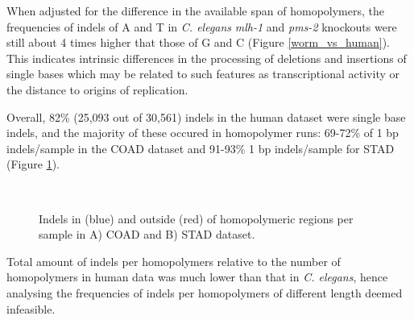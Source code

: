 When adjusted for the difference in the available span of homopolymers, the frequencies of 
indels of A and T in \textit{C. elegans} \textit{mlh-1} and \textit{pms-2} knockouts were still about 4 times higher that those of G and C (Figure \ref{worm_vs_human}). This indicates intrinsic differences in the processing of deletions and insertions of single bases which may be related to such 
features as transcriptional activity or the distance to origins of replication.

Overall, 82\% (25,093 out of 30,561) indels in the human dataset were single base indels, and the majority of these occured in homopolymer runs: 69-72\% of 1 bp indels/sample in the COAD dataset and 91-93\% 1 bp indels/sample for STAD (Figure \ref{stad_coad_homo}). 

\begin{figure}[h]
\\
\caption{Indels in (blue) and outside (red) of homopolymeric regions per sample in A) COAD and B) STAD dataset.}
\label{stad_coad_homo}
\end{figure}

Total amount of indels per homopolymers relative to the number of homopolymers in 
human data was much lower than that in \textit{C. elegans},
hence analysing the frequencies of indels per homopolymers of different length deemed infeasible.


